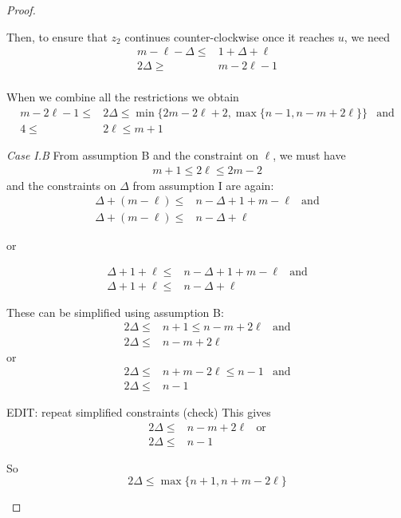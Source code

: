 \documentclass[letterpaper, 10pt]{article}
\begin{document}
\begin{proof}
\begin{proofpart}
Then, to ensure that $z_2$ continues counter-clockwise once
it reaches $u$, we need
\begin{align*}
  m - \ell - \Delta \leq &1 + \Delta + \ell \\
  2 \Delta \geq & m - 2\ell  -1 \\
\end{align*}

When we combine all the restrictions we obtain
\begin{align*}
m - 2\ell -1 \leq & 2 \Delta \leq \min \{ 2m - 2\ell +2, \max \{ n-1, n-m+2\ell \} \}& \text{and}\\
4 \leq & 2 \ell \leq m + 1
\end{align*}

\textit{Case I.B}
From assumption B and the constraint on $\ell$, we must have
\begin{align*}
  m + 1 \leq 2 \ell \leq 2m - 2
\end{align*}
and the constraints on $\Delta$ from assumption I are again:
\begin{align*}
  \Delta + (m - \ell) \leq & n - \Delta + 1 + m - \ell & \text{and}\\
 \Delta + (m - \ell) \leq & n - \Delta + \ell
\end{align*}
\begin{center}or\end{center}
\begin{align*}
\Delta + 1 + \ell \leq &n - \Delta + 1 + m - \ell & \text{and} \\
 \Delta + 1 + \ell \leq & n - \Delta + \ell
\end{align*}

These can be simplified using assumption B:
\begin{align*}
2 \Delta \leq & n+1 \leq n-m+2\ell & \text{and} \\
2 \Delta \leq & n - m + 2\ell
\end{align*}
or
\begin{align*}
2 \Delta \leq & n+m -2 \ell \leq n-1 & \text{and} \\
2 \Delta \leq & n -1
\end{align*}

EDIT: repeat simplified constraints (check)
This gives
\begin{align*}
  2 \Delta \leq & n - m + 2 \ell & \text{or} \\
  2 \Delta \leq & n - 1
\end{align*}

So
\[ 2 \Delta \leq \max \{ n+1, n + m - 2\ell \} \]


\end{proofpart}
\end{proof}
\end{document}
